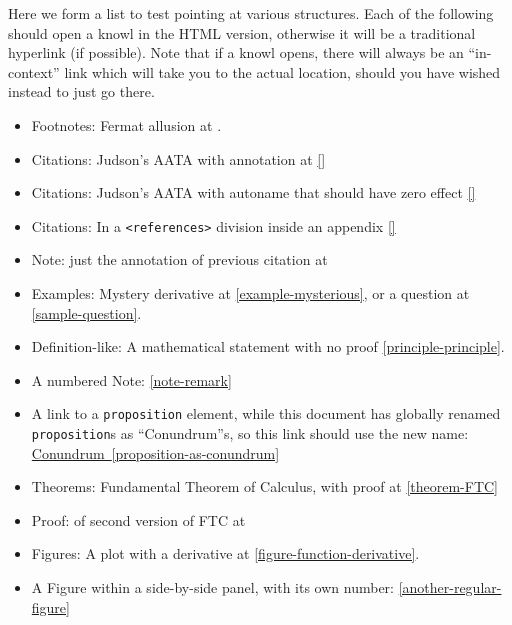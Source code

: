 \documentclass{sn-jnl}
\theoremstyle{thmstyleone}%
\theoremstyle{thmstyletwo}%
\theoremstyle{thmstylethree}%
\newcommand{\xreffont}{\relax}
\newcommand{\mono}[1]{\texttt{#1}}
\numberwithin{equation}{section}
\begin{document}
Here we form a list to test pointing at various structures.  Each of the following should open a knowl in the HTML version, otherwise it will be a traditional hyperlink (if possible).  Note that if a knowl opens, there will always be an ``in-context'' link which will take you to the actual location, should you have  wished instead to just go there.%
\begin{itemize}[label=\textbullet]
\item{}Footnotes: Fermat allusion at \hyperref[footnote-fermat]{{\xreffont 1}}.%
\item{}Citations: Judson's AATA with annotation at \hyperlink{biblio-judson-AATA}{[{\xreffont 1}]}%
\item{}Citations: Judson's AATA with autoname that should have zero effect \hyperlink{biblio-judson-AATA}{[{\xreffont 1}]}%
\item{}Citations: In a \mono{<references>} division inside an appendix \hyperlink{biblio-strang-article-uno}{[{\xreffont 1}]}%
\item{}Note: just the annotation of previous citation at \hyperlink{note-judson-AATA}{{\xreffont 1}}%
\item{}Examples: Mystery derivative at \hyperref[example-mysterious]{{\xreffont\ref{example-mysterious}}}, or a question at \hyperref[sample-question]{{\xreffont\ref{sample-question}}}.%
\item{}Definition-like: A mathematical statement with no proof \hyperref[principle-principle]{{\xreffont\ref{principle-principle}}}.%
\item{}A numbered Note: \hyperref[note-remark]{{\xreffont\ref{note-remark}}}%
\item{}A link to a \mono{proposition} element, while this document has globally renamed \mono{proposition}s as ``Conundrum''s, so this link should use the new name: \hyperref[proposition-as-conundrum]{Conundrum~{\xreffont\ref{proposition-as-conundrum}}}%
\item{}Theorems: Fundamental Theorem of Calculus, with proof at \hyperref[theorem-FTC]{{\xreffont\ref{theorem-FTC}}}%
\item{}Proof: of second version of FTC at \hyperlink{proof-FTC-corollary}{{\xreffont 1}}%
\item{}Figures: A plot with a derivative at \hyperref[figure-function-derivative]{{\xreffont\ref{figure-function-derivative}}}.%
\item{}A Figure within a side-by-side panel, with its own number: \hyperref[another-regular-figure]{{\xreffont\ref{another-regular-figure}}}%

\end{itemize}
\end{document}
